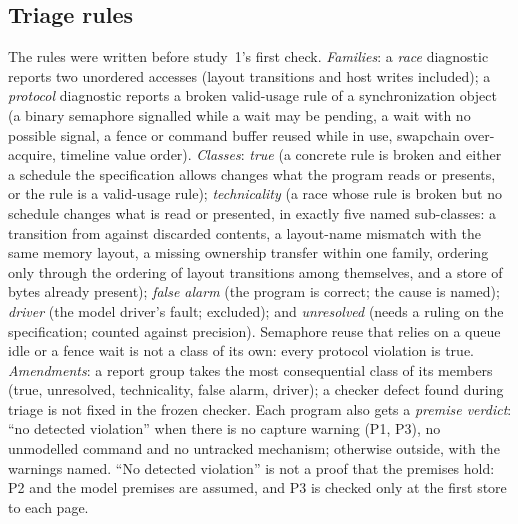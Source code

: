 \subsection{Triage rules}
The rules were written before study~1's first check. \emph{Families}: a \emph{race} diagnostic reports two
unordered accesses (layout transitions and host writes included); a \emph{protocol} diagnostic reports a broken
valid-usage rule of a synchronization object (a binary semaphore signalled while a wait may be pending, a wait with
no possible signal, a fence or command buffer reused while in use, swapchain over-acquire, timeline value order).
\emph{Classes}: \emph{true} (a concrete rule is broken and either a schedule the specification allows changes what
the program reads or presents, or the rule is a valid-usage rule); \emph{technicality} (a race whose rule is broken
but no schedule changes what is read or presented, in exactly five named sub-classes: a transition from
 against discarded contents, a layout-name mismatch with the same memory layout, a missing ownership
transfer within one family, ordering only through the ordering of layout transitions among themselves, and a store of
bytes already present); \emph{false alarm} (the program is correct; the cause is named); \emph{driver} (the model
driver's fault; excluded); and \emph{unresolved} (needs a ruling on the specification; counted against precision).
Semaphore reuse that relies on a queue idle or a fence wait is not a class of its own: every protocol violation is
true. \emph{Amendments}: a report group takes the most consequential class of its members
(true, unresolved, technicality, false alarm, driver); a checker defect found during triage is not fixed in the frozen
checker. Each program also gets a \emph{premise verdict}: ``no detected violation'' when there is no capture warning (P1,
P3), no unmodelled command and no untracked mechanism; otherwise outside, with the warnings named. ``No detected
violation'' is not a proof that the premises hold: P2 and the model premises are assumed, and P3 is checked only at the
first store to each page.

